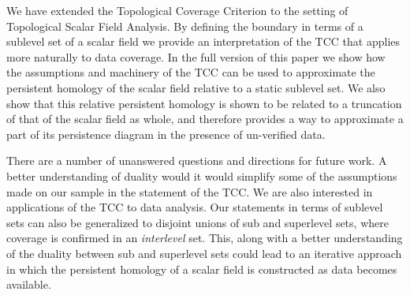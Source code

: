 
We have extended the Topological Coverage Criterion to the setting of Topological Scalar Field Analysis.
By defining the boundary in terms of a sublevel set of a scalar field we provide an interpretation of the TCC that applies more naturally to data coverage.
In the full version of this paper we show how the assumptions and machinery of the TCC can be used to approximate the persistent homology of the scalar field relative to a static sublevel set.
We also show that this relative persistent homology is shown to be related to a truncation of that of the scalar field as whole, and therefore provides a way to approximate a part of its persistence diagram in the presence of un-verified data.

There are a number of unanswered questions and directions for future work.
A better understanding of duality would it would simplify some of the assumptions made on our sample in the statement of the TCC.
We are also interested in applications of the TCC to data analysis.
Our statements in terms of sublevel sets can also be generalized to disjoint unions of sub and superlevel sets, where coverage is confirmed in an \emph{interlevel} set.
This, along with a better understanding of the duality between sub and superlevel sets could lead to an iterative approach in which the persistent homology of a scalar field is constructed as data becomes available.

